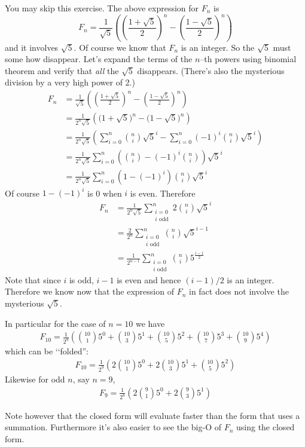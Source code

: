 You may skip this exercise.
The above expression for $F_n$ is
\[
F_n = 
\frac{1}{\sqrt{5}} 
\left( 
\left( \frac{1 + \sqrt{5}}{2} \right)^n
-
\left( \frac{1 - \sqrt{5}}{2} \right)^n
\right)
\]
and it involves $\sqrt{5}$. 
Of course we know that $F_n$ is an integer.
So the $\sqrt{5}$ must some how disappear.
Let's expand the terms of the $n$--th powers
using binomial theorem and
verify that \textit{all} the $\sqrt{5}$ disappears.
(There's also the mysterious division
by a very high power of 2.)
\begin{align*}
F_n 
&= 
\frac{1}{\sqrt{5}} 
\left( 
\left( \frac{1 + \sqrt{5}}{2} \right)^n
-
\left( \frac{1 - \sqrt{5}}{2} \right)^n
\right) \\
&=
\frac{1}{2^n\sqrt{5}} 
\left( 
\bigl(
1 + \sqrt{5}
\bigr)^n
-
\bigl(
1 - \sqrt{5}
\bigr)^n
\right) \\
&=
\frac{1}{2^n\sqrt{5}} 
\left(
\sum_{i=0}^n \binom{n}{i}\sqrt{5}^i
- 
\sum_{i=0}^n (-1)^i\binom{n}{i}\sqrt{5}^i
\right) \\
&=
\frac{1}{2^n\sqrt{5}} 
\sum_{i=0}^n 
\left(
\binom{n}{i}
- 
(-1)^i\binom{n}{i}
\right)
\sqrt{5}^i \\
&=
\frac{1}{2^n\sqrt{5}} 
\sum_{i=0}^n 
(1
- 
(-1)^i)
\binom{n}{i}
\sqrt{5}^i
\end{align*}
Of course $1 - (-1)^i$ is 0 when $i$ is even.
Therefore
\begin{align*}
F_n 
&=
\frac{1}{2^n\sqrt{5}} 
\sum_{\substack{i=0 \\ i \text{ odd}}}^n 
2
\binom{n}{i}
\sqrt{5}^i \\
&=
\frac{2}{2^n} 
\sum_{\substack{i=0 \\ i \text{ odd}}}^n 
\binom{n}{i}
\sqrt{5}^{i-1} \\
&=
\frac{1}{2^{n-1}} 
\sum_{\substack{i=0 \\ i \text{ odd}}}^n 
\binom{n}{i}
5^{\frac{i-1}{2}}
\end{align*}
Note that since $i$ is odd, $i-1$ is even and 
hence $(i-1)/2$ is an integer.
Therefore we know now
that the expression of $F_n$ in fact does not involve the
mysterious $\sqrt{5}$.

In particular for the case of $n = 10$ we have
\begin{align*}
F_{10}
= \frac{1}{2^{9}} 
\left(
\binom{10}{1} 5^{0} +
\binom{10}{3} 5^{1} +
\binom{10}{5} 5^{2} +
\binom{10}{7} 5^{3} +
\binom{10}{9} 5^{4}
\right)
\end{align*}
which can be \lq\lq folded'':
\begin{align*}
F_{10}
= \frac{1}{2^{9}} 
\left(
2\binom{10}{1} 5^{0} +
2\binom{10}{3} 5^{1} +
\binom{10}{5} 5^{2}
\right)
\end{align*}
Likewise for odd $n$, say $n = 9$, 
\begin{align*}
F_{9}
= \frac{1}{2^{8}} 
\left(
2\binom{9}{1} 5^{0} +
2\binom{9}{3} 5^{1}
\right)
\end{align*}

Note however that the closed form will evaluate faster
than the form that uses a summation.
Furthermore it's also easier to see the big-O of $F_n$
using the closed form.
